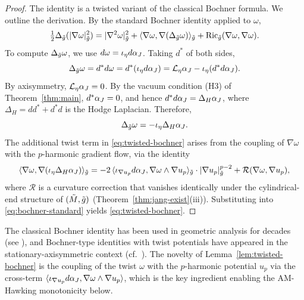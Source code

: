 \begin{proof}
The identity is a twisted variant of the classical Bochner formula. We outline the derivation. By the standard Bochner identity applied to $\omega$,
\begin{equation}\label{eq:bochner-standard}
\tfrac{1}{2}\Delta_{\tilde{g}}(|\nabla \omega|_{\tilde{g}}^2) = |\nabla^2 \omega|_{\tilde{g}}^2 + \langle \nabla \omega, \nabla(\Delta_{\tilde{g}} \omega)\rangle_{\tilde{g}} + \mathrm{Ric}_{\tilde{g}}(\nabla \omega, \nabla \omega).
\end{equation}
To compute $\Delta_{\tilde{g}} \omega$, we use $d\omega = \iota_\eta d\alpha_J$. Taking $d^*$ of both sides,
\begin{equation}
\Delta_{\tilde{g}} \omega = d^* d\omega = d^*(\iota_\eta d\alpha_J) = \mathcal{L}_\eta \alpha_J - \iota_\eta (d^* d\alpha_J).
\end{equation}
By axisymmetry, $\mathcal{L}_\eta \alpha_J = 0$. By the vacuum condition (H3) of Theorem~\ref{thm:main}, $d^* \alpha_J = 0$, and hence $d^* d\alpha_J = \Delta_H \alpha_J$, where $\Delta_H = dd^* + d^*d$ is the Hodge Laplacian. Therefore,
\begin{equation}\label{eq:twist-laplacian}
\Delta_{\tilde{g}} \omega = -\iota_\eta \Delta_H \alpha_J.
\end{equation}
The additional twist term in \eqref{eq:twisted-bochner} arises from the coupling of $\nabla \omega$ with the $p$-harmonic gradient flow, via the identity
\begin{equation}
\langle \nabla \omega, \nabla(\iota_\eta \Delta_H \alpha_J)\rangle_{\tilde{g}}
= -2\,\langle \iota_{\nabla u_p} d\alpha_J, \nabla \omega \wedge \nabla u_p \rangle_{\tilde{g}} \cdot |\nabla u_p|_{\tilde{g}}^{p-2} + \mathcal{R}(\nabla \omega, \nabla u_p),
\end{equation}
where $\mathcal{R}$ is a curvature correction that vanishes identically under the cylindrical-end structure of $(\tilde{M}, \tilde{g})$ (Theorem~\ref{thm:jang-exist}(iii)). Substituting into \eqref{eq:bochner-standard} yields \eqref{eq:twisted-bochner}.
\end{proof}

\begin{remark}
The classical Bochner identity has been used in geometric analysis for decades (see \cite{li2012book, chavel1984}), and Bochner-type identities with twist potentials have appeared in the stationary-axisymmetric context (cf.\ \cite{anderssonmars2008, dain2012}). The novelty of Lemma~\ref{lem:twisted-bochner} is the coupling of the twist $\omega$ with the $p$-harmonic potential $u_p$ via the cross-term $\langle \iota_{\nabla u_p} d\alpha_J, \nabla \omega \wedge \nabla u_p\rangle$, which is the key ingredient enabling the AM-Hawking monotonicity below.
\end{remark}

